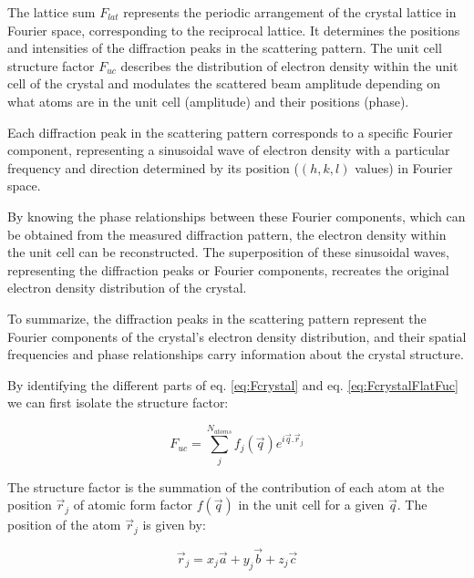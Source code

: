 The lattice sum $F_{lat}$ represents the periodic arrangement of the crystal lattice in Fourier space, corresponding to the reciprocal lattice.
It determines the positions and intensities of the diffraction peaks in the scattering pattern.
The unit cell structure factor $F_{uc}$ describes the distribution of electron density within the unit cell of the crystal and modulates the scattered beam amplitude depending on what atoms are in the unit cell (amplitude) and their positions (phase).

Each diffraction peak in the scattering pattern corresponds to a specific Fourier component, representing a sinusoidal wave of electron density with a particular frequency and direction determined by its position ($(h, k, l)$ values) in Fourier space.

By knowing the phase relationships between these Fourier components, which can be obtained from the measured diffraction pattern, the electron density within the unit cell can be reconstructed.
The superposition of these sinusoidal waves, representing the diffraction peaks or Fourier components, recreates the original electron density distribution of the crystal.

To summarize, the diffraction peaks in the scattering pattern represent the Fourier components of the crystal's electron density distribution, and their spatial frequencies and phase relationships carry information about the crystal structure.

By identifying the different parts of eq. \ref{eq:Fcrystal} and eq. \ref{eq:FcrystalFlatFuc} we can first isolate the structure factor:

\begin{equation}
    \label{eq:StrucFactor}
    F_{uc} = \sum_j^{N_{atoms}} f_j(\vec{q}) e^{i\vec{q}.\vec{r}_j}
\end{equation}

The structure factor is the summation of the contribution of each atom at the position $\vec{r}_j$ of atomic form factor $f(\vec{q})$ in the unit cell for a given $\vec{q}$.
The position of the atom $\vec{r}_j$ is given by:

\begin{equation}
    \label{eq:AtomPos}
    \vec{r}_j = x_j\vec{a} + y_j\vec{b} + z_j\vec{c}
\end{equation}

